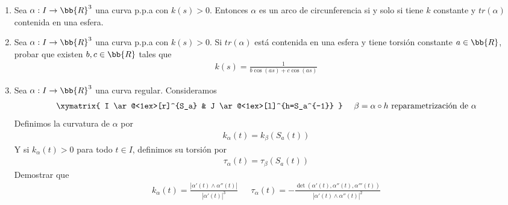\begin{ejercicio}
\begin{enumerate}
        Como $(\frac{1}{k})' = -\frac{k'}{k^2} < 0$ por la condición \textit{ad-hoc} del enunciado nos queda que necesariamente
        \begin{gather*}
            \frac{\tau}{k} + \left[\frac{1}{\tau} \left(\frac{1}{k}\right)' \right]' = 0
        \end{gather*}
        Lo que finalmente, al sustituir en $f'$ nos dice $f'\equiv 0$, o equivalentemente, $f(s) = a$ para todo $s\in I$, es decir
        \begin{align*}
            a &= \alpha + \frac{1}{k}N - \frac{1}{\tau}\left(\frac{1}{k}\right)'B\\
            a-\alpha &= \frac{1}{k}N - \frac{1}{\tau}\left(\frac{1}{k}\right)'B\\
            |\alpha - a|^2 &= \frac{1}{k^2} - \left[\frac{1}{\tau}\left(\frac{1}{k}\right)'\right]^2 = R^2
        \end{align*}
        Lo que nos dice que $tr(\alpha)\subset S^2(a, R)$.

        \item Sea $\alpha : I \to \bb{R}^3$ una curva p.p.a con $k(s)>0$. Entonces $\alpha$ es un arco de circunferencia si y solo si tiene $k$ constante y $tr(\alpha)$ contenida en una esfera.
        
        \item Sea $\alpha:I\to \bb{R}^3$ una curva p.p.a con $k(s)>0$. Si $tr(\alpha)$ está contenida en una esfera y tiene torsión constante $a\in \bb{R}$, probar que existen $b,c\in \bb{R}$ tales que 
        \begin{gather*}
            k(s) = \frac{1}{b\cos(as) + c\cos(as)}
        \end{gather*}

        \item Sea $ \alpha : I \to \bb{R}^3$ una curva regular. Consideramos 
        \begin{gather*}
            \xymatrix{
                I \ar@<1ex>[r]^{S_a} & J \ar@<1ex>[l]^{h=S_a^{-1}}
            }\ \ \ \ \beta = \alpha \circ h \text{ reparametrización de }\alpha
        \end{gather*}
        Definimos la curvatura de $\alpha$ por 
        \begin{gather*}
            k_\alpha(t) = k_\beta(S_a(t))
        \end{gather*}
        Y si $k_\alpha(t)>0$ para todo $t\in I$, definimos su torsión por 
        \begin{gather*}
            \tau_\alpha(t) = \tau_\beta(S_a(t))
        \end{gather*}
        Demostrar que 
        \begin{gather*}
            k_\alpha(t) = \frac{|\alpha'(t) \wedge \alpha''(t)|}{|\alpha'(t)|^3}\ \ \ \ \ \ \ \tau_\alpha(t) = - \frac{\det(\alpha'(t), \alpha''(t), \alpha'''(t))}{|\alpha'(t) \wedge \alpha''(t)|^2}
        \end{gather*}
    \end{enumerate}
\end{ejercicio}

